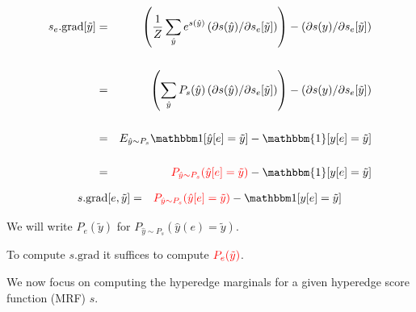 {

\bigskip
\begin{eqnarray*}
    s_e.\mathrm{grad}[\tilde{y}]
    & = & \left(\frac{1}{Z} \sum_{\hat{y}} e^{s(\hat{y})} \left(\partial s(\hat{y})/\partial s_e[\tilde{y}]\right)\right)
    - \left(\partial s(y) /\partial s_e[\tilde{y}]\right)    \\
    \\
    & = & \left(\sum_{\hat{y}} P_s(\hat{y}) \left(\partial s(\hat{y})/\partial s_e[\tilde{y}]\right)\right)
    - \left(\partial s(y) /\partial s_e[\tilde{y}]\right)    \\
    \\
    & = & E_{\hat{y} \sim P_s}\bbone[\hat{y}[e] = \tilde{y}]
    - \mathbbm{1}[y[e] = \tilde{y}] \\
    \\
    & = & {\color{red} P_{\hat{y} \sim P_s}(\hat{y}[e] = \tilde{y})}
      - \mathbbm{1}[y[e] = \tilde{y}]
\end{eqnarray*}


\begin{eqnarray*}
    s.\mathrm{grad}[e,\tilde{y}]
    & = &  {\color{red} P_{\hat{y} \sim P_s}(\hat{y}[e] = \tilde{y})} - \bbone[y[e] = \tilde{y}] \\
\end{eqnarray*}

\vfill
We will write {\color{red} $P_e(\tilde{y})$} for {\color{red} $P_{\hat{y} \sim P_s}(\hat{y}(e) = \tilde{y})$}.

\vfill
To compute $s.\mathrm{grad}$ it suffices to compute ${\color{red} P_e(\tilde{y})}$.

\vfill
We now focus on computing the hyperedge marginals for a given hyperedge score function (MRF) $s$.

}
